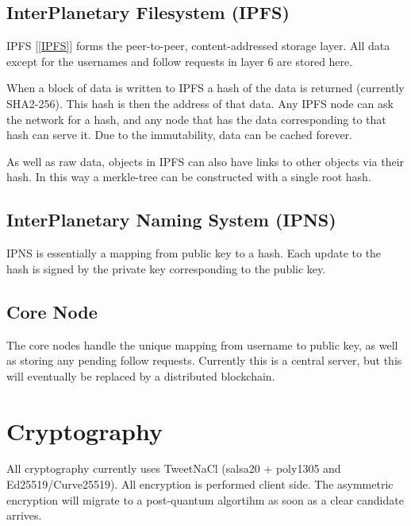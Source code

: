 \documentclass[12pt]{article}
\begin{document}
\subsection*{InterPlanetary Filesystem (IPFS)}
IPFS [\ref{IPFS}] forms the peer-to-peer, content-addressed storage layer. All data except for the usernames and follow requests in layer 6 are stored here. 


When a block of data is written to IPFS a hash of the data is returned (currently SHA2-256). This hash is then the address of that data. Any IPFS node can ask the network for a hash, and any node that has the data corresponding to that hash can serve it. Due to the immutability, data can be cached forever. 

As well as raw data, objects in IPFS can also have links to other objects via their hash. In this way a merkle-tree can be constructed with a single root hash. 

\subsection*{InterPlanetary Naming System (IPNS)}
IPNS is essentially a mapping from public key to a hash. Each update to the hash is signed by the private key corresponding to the public key. 


\subsection*{Core Node}
The core nodes handle the unique mapping from username to public key, as well as storing any pending follow requests. Currently this is a central server, but this will eventually be replaced by a distributed blockchain. 


\section*{Cryptography}
All cryptography currently uses TweetNaCl (salsa20 + poly1305 and Ed25519/Curve25519). All encryption is performed client side. The asymmetric encryption will migrate to a post-quantum algortihm as soon as a clear candidate arrives. 

\end{document}

